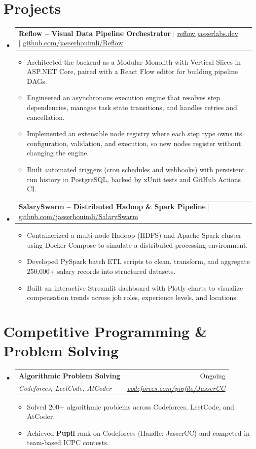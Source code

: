 \documentclass[letterpaper,11pt]{article}
\makeatletter
\newcommand{\resumeItem}[1]{
  \item\small{
    {#1 \vspace{-2pt}}
  }
}
\newcommand{\resumeSubheading}[4]{
  \vspace{-2pt}\item
    \begin{tabular*}{0.97\textwidth}[t]{l@{\extracolsep{\fill}}r}
      \textbf{#1} & #2 \\
      \textit{\small#3} & \textit{\small #4} \\
    \end{tabular*}\vspace{-7pt}
}
\newcommand{\resumeProjectHeading}[2]{
    \item
    \begin{tabular*}{0.97\textwidth}{l@{\extracolsep{\fill}}r}
      \small#1 & #2 \\
    \end{tabular*}\vspace{-7pt}
}
\newcommand{\resumeSubHeadingListStart}{\begin{itemize}[leftmargin=0.15in, label={}]}
\newcommand{\resumeSubHeadingListEnd}{\end{itemize}}
\newcommand{\resumeItemListStart}{\begin{itemize}}
\newcommand{\resumeItemListEnd}{\end{itemize}\vspace{-5pt}}
\makeatother
\begin{document}
\section{Projects}
    \resumeSubHeadingListStart
      \resumeProjectHeading
          {\textbf{Reflow -- Visual Data Pipeline Orchestrator} $|$ \href{https://reflow.jasserlabs.dev/}{\underline{reflow.jasserlabs.dev}} $|$ \href{https://github.com/jasserhouimli/Reflow}{\underline{github.com/jasserhouimli/Reflow}}}{}
          \resumeItemListStart
            \resumeItem{Architected the backend as a Modular Monolith with Vertical Slices in ASP.NET Core, paired with a React Flow editor for building pipeline DAGs.}
            \resumeItem{Engineered an asynchronous execution engine that resolves step dependencies, manages task state transitions, and handles retries and cancellation.}
            \resumeItem{Implemented an extensible node registry where each step type owns its configuration, validation, and execution, so new nodes register without changing the engine.}
            \resumeItem{Built automated triggers (cron schedules and webhooks) with persistent run history in PostgreSQL, backed by xUnit tests and GitHub Actions CI.}
          \resumeItemListEnd
      \resumeProjectHeading
          {\textbf{SalarySwarm -- Distributed Hadoop \& Spark Pipeline} $|$ \href{https://github.com/jasserhouimli/SalarySwarm}{\underline{github.com/jasserhouimli/SalarySwarm}}}{}
          \resumeItemListStart
            \resumeItem{Containerized a multi-node Hadoop (HDFS) and Apache Spark cluster using Docker Compose to simulate a distributed processing environment.}
            \resumeItem{Developed PySpark batch ETL scripts to clean, transform, and aggregate 250,000+ salary records into structured datasets.}
            \resumeItem{Built an interactive Streamlit dashboard with Plotly charts to visualize compensation trends across job roles, experience levels, and locations.}
          \resumeItemListEnd
    \resumeSubHeadingListEnd


\section{Competitive Programming \& Problem Solving}
  \resumeSubHeadingListStart
    \resumeSubheading
      {Algorithmic Problem Solving}{Ongoing}
      {Codeforces, LeetCode, AtCoder}{\href{https://codeforces.com/profile/JasserCC}{\underline{codeforces.com/profile/JasserCC}}}
      \resumeItemListStart
        \resumeItem{Solved 200+ algorithmic problems across Codeforces, LeetCode, and AtCoder.}
        \resumeItem{Achieved \textbf{Pupil} rank on Codeforces (Handle: JasserCC) and competed in team-based ICPC contests.}
      \resumeItemListEnd
  \resumeSubHeadingListEnd
\end{document}
